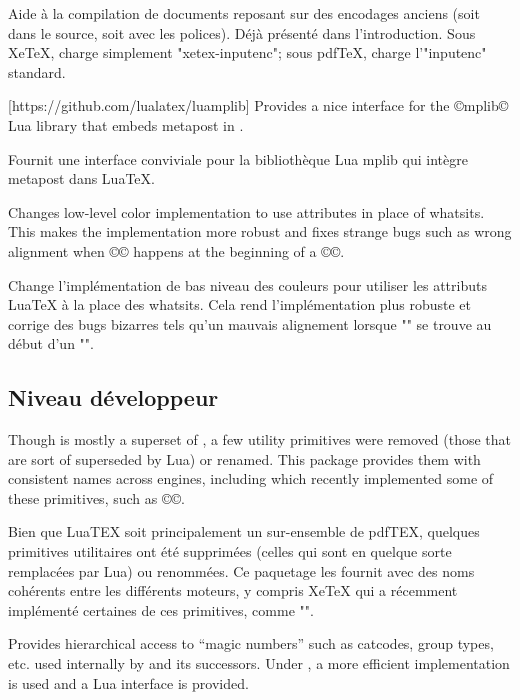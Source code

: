 \documentclass{lltxdoc}
\begin{document}
Aide à la compilation de documents reposant sur des encodages anciens (soit dans le source, soit avec les polices). Déjà présenté dans l'introduction. Sous XeTeX, charge simplement "xetex-inputenc"; sous pdfTeX, charge l'"inputenc" standard.

[https://github.com/lualatex/luamplib]
Provides a nice interface for the ©mplib© Lua library that embeds metapost in
\luatex.

Fournit une interface conviviale pour la bibliothèque Lua mplib qui intègre metapost dans LuaTeX.

Changes low-level color implementation to use \luatex attributes in place of
whatsits. This makes the implementation more robust and fixes strange bugs
such as wrong alignment when ©\color© happens at the beginning of a ©\vbox©.

Change l'implémentation de bas niveau des couleurs pour utiliser les attributs LuaTeX à la place des whatsits. Cela rend l'implémentation plus robuste et corrige des bugs bizarres tels qu'un mauvais alignement lorsque "\color" se trouve au début d'un "\vbox".

\subsection{Niveau développeur}

Though \luatex is mostly a superset of \pdftex, a few utility primitives were
removed (those that are sort of superseded by Lua) or renamed. This package
provides them with consistent names across engines, including \xetex which
recently implemented some of these primitives, such as ©\strcmp©.

Bien que LuaTEX soit principalement un sur-ensemble de pdfTEX, quelques primitives utilitaires ont été supprimées (celles qui sont en quelque sorte remplacées par Lua) ou renommées. Ce paquetage les fournit avec des noms cohérents entre les différents moteurs, y compris XeTeX qui a récemment implémenté certaines de ces primitives, comme "\strcmp".
%

Provides hierarchical access to ``magic numbers'' such as catcodes, group
types, etc. used internally by \tex and its successors. Under \luatex, a more
efficient implementation is used and a Lua interface is provided.
\end{document}
